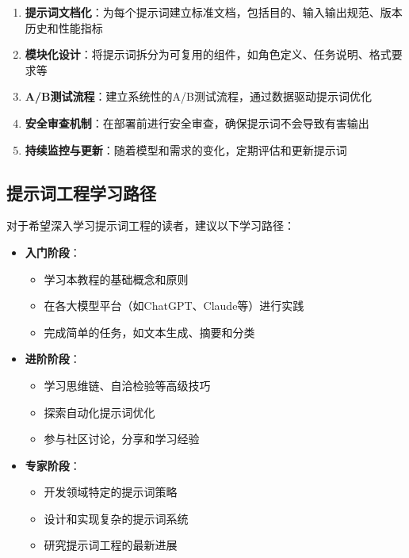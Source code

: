 \documentclass[12pt]{ctexart}
\begin{document}
\begin{enumerate}
  \item \textbf{提示词文档化}：为每个提示词建立标准文档，包括目的、输入输出规范、版本历史和性能指标
  \item \textbf{模块化设计}：将提示词拆分为可复用的组件，如角色定义、任务说明、格式要求等
  \item \textbf{A/B测试流程}：建立系统性的A/B测试流程，通过数据驱动提示词优化
  \item \textbf{安全审查机制}：在部署前进行安全审查，确保提示词不会导致有害输出
  \item \textbf{持续监控与更新}：随着模型和需求的变化，定期评估和更新提示词
\end{enumerate}

\subsection{提示词工程学习路径}
对于希望深入学习提示词工程的读者，建议以下学习路径：

\begin{itemize}
  \item \textbf{入门阶段}：
    \begin{itemize}
      \item 学习本教程的基础概念和原则
      \item 在各大模型平台（如ChatGPT、Claude等）进行实践
      \item 完成简单的任务，如文本生成、摘要和分类
    \end{itemize}
  \item \textbf{进阶阶段}：
    \begin{itemize}
      \item 学习思维链、自洽检验等高级技巧
      \item 探索自动化提示词优化
      \item 参与社区讨论，分享和学习经验
    \end{itemize}
  \item \textbf{专家阶段}：
    \begin{itemize}
      \item 开发领域特定的提示词策略
      \item 设计和实现复杂的提示词系统
      \item 研究提示词工程的最新进展
    \end{itemize}
\end{itemize}

\end{document}
